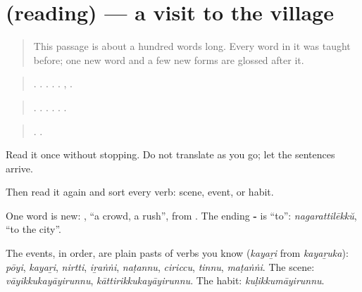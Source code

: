 \section[(reading)]{(reading) — a visit to the village}

\label{lesson:ML-C340-gramathil}



\begin{quote}
This passage is about a hundred words long. Every word in it was taught before; one new word and a few new forms are glossed after it.
\end{quote}

\begin{tcolorbox}[breakable,skin=enhanced,colback=orange!6,colframe=orange!45!black,boxrule=0.5pt,arc=1mm,left=6pt,right=6pt,top=4pt,bottom=4pt,fonttitle=\bfseries,title={Read this}]
\begin{quote}
    .     .   .    .   .  ,   .
\end{quote}

\begin{quote}
    .    .     .       .      .      .
\end{quote}

\begin{quote}
    .    .
\end{quote}

Read it once without stopping. Do not translate as you go; let the sentences arrive.

Then read it again and sort every verb: scene, event, or habit.
\end{tcolorbox}

\begin{culture}
One word is new: \textbf{}, \textquotedblleft{}a crowd, a rush\textquotedblright{}, from \textbf{}. The ending \textbf{-} is \textquotedblleft{}to\textquotedblright{}: \emph{nagarattilēkkŭ}, \textquotedblleft{}to the city\textquotedblright{}.

The events, in order, are plain pasts of verbs you know (\emph{kayaṟi} from \emph{kayaṟuka}): \emph{pōyi}, \emph{kayaṟi}, \emph{nirtti}, \emph{iṟaṅṅi}, \emph{naṭannu}, \emph{ciriccu}, \emph{tinnu}, \emph{maṭaṅṅi}. The scene: \emph{vāyikkukayāyirunnu}, \emph{kāttirikkukayāyirunnu}. The habit: \emph{kuḷikkumāyirunnu}.
\end{culture}

